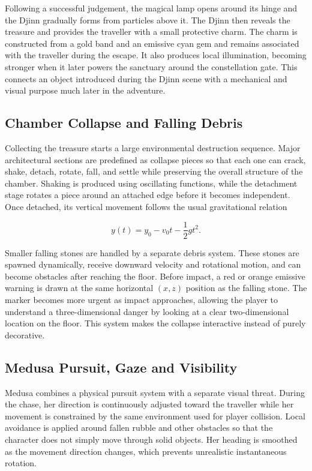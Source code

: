 \documentclass[11pt,a4paper]{article}
\begin{document}
Following a successful judgement, the magical lamp opens around its hinge and
the Djinn gradually forms from particles above it. The Djinn then reveals the
treasure and provides the traveller with a small protective charm. The charm is
constructed from a gold band and an emissive cyan gem and remains associated
with the traveller during the escape. It also produces local illumination,
becoming stronger when it later powers the sanctuary around the constellation
gate. This connects an object introduced during the Djinn scene with a
mechanical and visual purpose much later in the adventure.

\subsection{Chamber Collapse and Falling Debris}

Collecting the treasure starts a large environmental destruction sequence.
Major architectural sections are predefined as collapse pieces so that each
one can crack, shake, detach, rotate, fall, and settle while preserving the
overall structure of the chamber. Shaking is produced using oscillating
functions, while the detachment stage rotates a piece around an attached edge
before it becomes independent. Once detached, its vertical movement follows
the usual gravitational relation

\begin{equation}
    y(t)
    =
    y_0-v_0t-\frac{1}{2}gt^2 .
\end{equation}

Smaller falling stones are handled by a separate debris system. These stones
are spawned dynamically, receive downward velocity and rotational motion, and
can become obstacles after reaching the floor. Before impact, a red or orange
emissive warning is drawn at the same horizontal $(x,z)$ position as the
falling stone. The marker becomes more urgent as impact approaches, allowing
the player to understand a three-dimensional danger by looking at a clear
two-dimensional location on the floor. This system makes the collapse
interactive instead of purely decorative.

\subsection{Medusa Pursuit, Gaze and Visibility}

Medusa combines a physical pursuit system with a separate visual threat. During
the chase, her direction is continuously adjusted toward the traveller while
her movement is constrained by the same environment used for player collision.
Local avoidance is applied around fallen rubble and other obstacles so that the
character does not simply move through solid objects. Her heading is smoothed
as the movement direction changes, which prevents unrealistic instantaneous
rotation.
\end{document}
